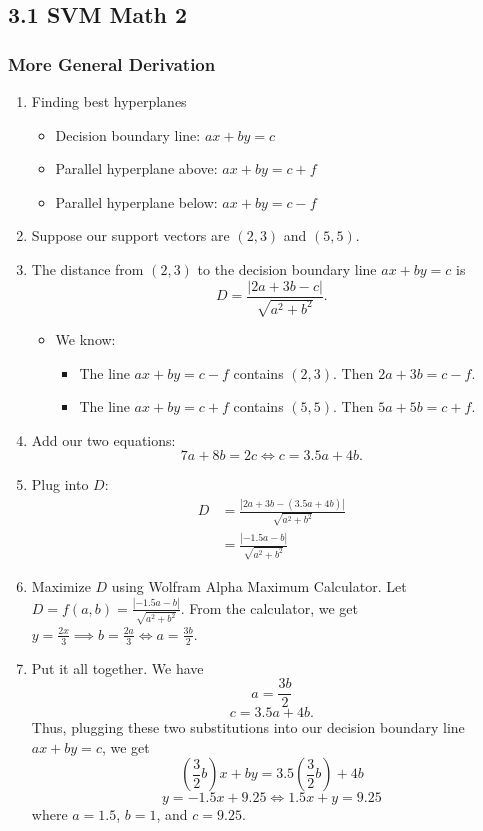 \documentclass{article}
\begin{document}
\subsection*{3.1 SVM Math 2}
\subsubsection*{More General Derivation}
\begin{enumerate}
    \item Finding best hyperplanes
    \begin{itemize}
        \item Decision boundary line: $ax + by = c$
        \item Parallel hyperplane above: $ax + by = c + f$
        \item Parallel hyperplane below: $ax + by = c - f$
    \end{itemize}
    \item Suppose our support vectors are $(2, 3)$ and $(5, 5)$.
    \item The distance from $(2, 3)$ to the decision boundary line $ax + by = c$ is \[D = \frac{|2a + 3b - c|}{\sqrt{a^2 + b^2}}.\]
    \begin{itemize}
        \item We know:
        \begin{itemize}
            \item The line $ax + by = c - f$ contains $(2, 3)$. Then $2a + 3b = c - f$.
            \item The line $ax + by = c + f$ contains $(5, 5)$. Then $5a + 5b = c + f$.
        \end{itemize}
    \end{itemize}
    \item Add our two equations: \[7a + 8b = 2c \Longleftrightarrow c = 3.5a + 4b.\]
    \item Plug into $D$: \begin{align*} D &= \frac{|2a + 3b - (3.5a + 4b)|}{\sqrt{a^2 + b^2}} \\ &= \frac{|-1.5a - b|}{\sqrt{a^2 + b^2}} \end{align*}
    \item Maximize $D$ using Wolfram Alpha Maximum Calculator. Let $D = f(a, b) = \frac{|-1.5a - b|}{\sqrt{a^2 + b^2}}$. From the calculator, we get $y = \frac{2x}{3} \implies b = \frac{2a}{3} \Longleftrightarrow a = \frac{3b}{2}$.
    \item Put it all together. We have \[a = \frac{3b}{2}\] \[c = 3.5a + 4b.\] Thus, plugging these two substitutions into our decision boundary line $ax + by = c$, we get \[\left(\frac{3}{2}b\right)x + by = 3.5 \left(\frac{3}{2}b\right) + 4b\] \[y = -1.5x + 9.25 \Longleftrightarrow 1.5x + y = 9.25\] where $a = 1.5$, $b = 1$, and $c = 9.25$.
\end{enumerate}
\end{document}
